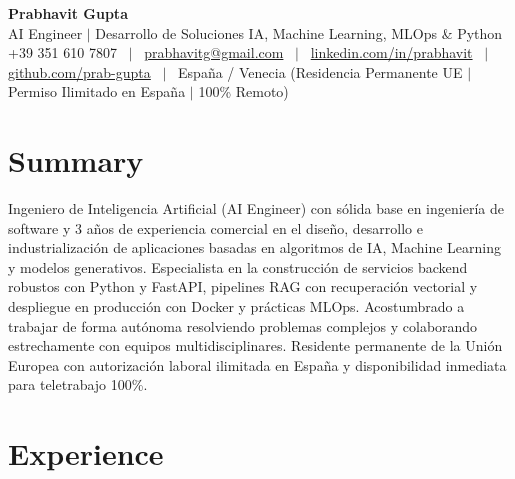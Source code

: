 \documentclass[a4paper,10pt]{article}
\begin{document}
\begin{minipage}[c]{0.80\textwidth}
  {\Huge\bfseries Prabhavit Gupta}\\[3pt]
  {\color{accent}\large AI Engineer $\vert$ Desarrollo de Soluciones IA, Machine Learning, MLOps \& Python}\\[6pt]
  {\footnotesize +39 351 610 7807 ~$\vert$~
  \href{mailto:prabhavitg@gmail.com}{prabhavitg@gmail.com} ~$\vert$~
  \href{https://www.linkedin.com/in/prabhavit/}{linkedin.com/in/prabhavit} ~$\vert$~
  \href{https://github.com/prab-gupta}{github.com/prab-gupta} ~$\vert$~
  España / Venecia (Residencia Permanente UE $\vert$ Permiso Ilimitado en España $\vert$ 100\% Remoto)}
\end{minipage}\hfill

\section{Summary}
Ingeniero de Inteligencia Artificial (AI Engineer) con sólida base en ingeniería de software y 3 años de experiencia comercial en el diseño, desarrollo e industrialización de aplicaciones basadas en algoritmos de IA, Machine Learning y modelos generativos. Especialista en la construcción de servicios backend robustos con Python y FastAPI, pipelines RAG con recuperación vectorial y despliegue en producción con Docker y prácticas MLOps. Acostumbrado a trabajar de forma autónoma resolviendo problemas complejos y colaborando estrechamente con equipos multidisciplinares. Residente permanente de la Unión Europea con autorización laboral ilimitada en España y disponibilidad inmediata para teletrabajo 100\%.

\section{Experience}
\end{document}
